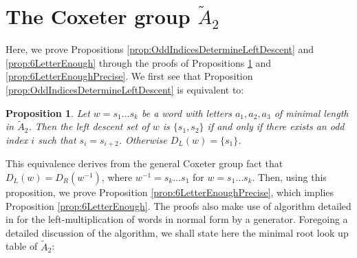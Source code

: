 \documentclass{article}
\newtheorem{proposition}{Proposition}
\begin{document}
\section{The Coxeter group $\widetilde{A}_2$}
\par %
\par Here, we prove Propositions \ref{prop:OddIndicesDetermineLeftDescent} and \ref{prop:6LetterEnough} through the proofs of Propositions \ref{prop:OddIndicesDetermineLeftDescentPrecise} and \ref{prop:6LetterEnoughPrecise}. We first see that Proposition \ref{prop:OddIndicesDetermineLeftDescent} is equivalent to:
\begin{proposition}\label{prop:OddIndicesDetermineLeftDescentPrecise}
    Let $w=s_1\ldots s_k$ be a word with letters $a_1, a_2, a_3$ of minimal length in $\widetilde{A}_2$. Then the left descent set of $w$ is $\{s_1, s_2\}$ if and only if there exists an odd index $i$ such that $s_i = s_{i+2}$. Otherwise $D_L(w)=\{s_1\}$.
\end{proposition}
This equivalence derives from the general Coxeter group fact that $D_L(w)=D_R(w^{-1})$, where $w^{-1}=s_k\ldots s_1$ for $w=s_1\ldots s_k$. Then, using this proposition, we prove Proposition \ref{prop:6LetterEnoughPrecise}, which implies Proposition \ref{prop:6LetterEnough}. The proofs also make use of algorithm detailed in \cite[Pseudocode, p. 13]{casselman2008computationcoxetergroupsii} for the left-multiplication of words in normal form by a generator. Foregoing a detailed discussion of the algorithm, we shall state here the minimal root look up table\cite[p.8]{casselman2008computationcoxetergroupsii} of $\widetilde{A}_2$:
\end{document}
